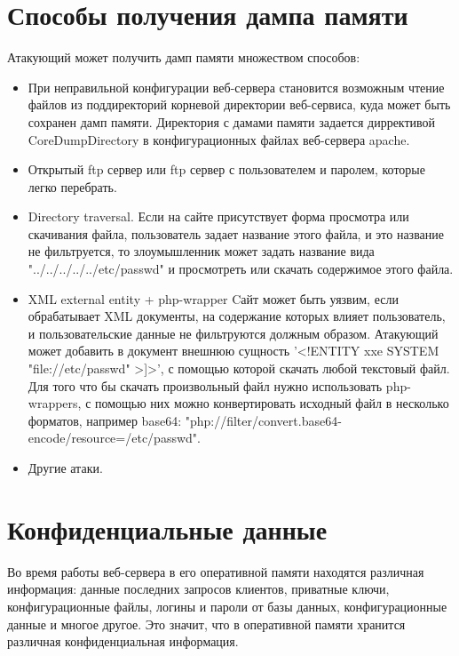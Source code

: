 \documentclass[20pt]{article}
\begin{document}
\newpage

\section{Способы получения дампа памяти}

Атакующий может получить дамп памяти множеством способов:
\begin{itemize}
  \item При неправильной конфигурации веб-сервера становится возможным чтение
  файлов из поддиректорий корневой директории веб-сервиса\cite{directory-listing},
  куда может быть сохранен дамп памяти. Директория с дамами памяти задается
  диррективой CoreDumpDirectory в конфигурационных файлах веб-сервера apache.
  \item Открытый ftp сервер или ftp сервер с пользователем и паролем, которые
  легко перебрать.
  \item Directory traversal\cite{directory-traversal}.
  Если на сайте присутствует форма просмотра или скачивания файла,
  пользователь задает название этого файла, и это название не фильтруется, то
  злоумышленник может задать название вида "../../../../../etc/passwd" и просмотреть
  или скачать содержимое этого файла.
  \item XML external entity\cite{xxe} + php-wrapper\cite{php-wrappers}
  Cайт может быть уязвим, если обрабатывает XML документы, на содержание которых
  влияет пользователь, и пользовательские данные не фильтруются должным образом.
  Атакующий может добавить в документ внешнюю сущность '<!ENTITY xxe SYSTEM "file://etc/passwd" >]>',
  с помощью которой скачать любой текстовый файл. Для того что бы скачать
  произвольный файл нужно использовать php-wrappers, с помощью них можно
  конвертировать исходный файл в несколько форматов, например base64:
  "php://filter/convert.base64-encode/resource=/etc/passwd".
  \item Другие атаки.
\end{itemize}

\newpage

\section{Конфиденциальные данные}

Во время работы веб-сервера в его оперативной памяти находятся различная
информация: данные последних запросов клиентов, приватные ключи, конфигурационные
файлы, логины и пароли от базы данных, конфигурационные данные и многое другое.
Это значит, что в оперативной памяти хранится различная конфиденциальная информация.
\end{document}

